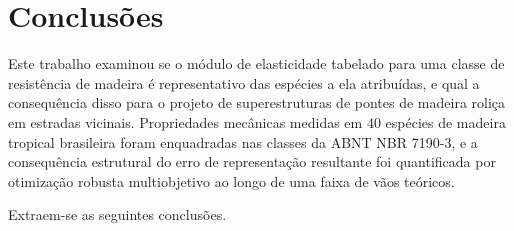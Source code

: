 \section{Conclusões}\label{sec:conclusions}

Este trabalho examinou se o módulo de elasticidade tabelado para uma classe de resistência de madeira é representativo das espécies a ela atribuídas, e qual a consequência disso para o projeto de superestruturas de pontes de madeira roliça em estradas vicinais. Propriedades mecânicas medidas em 40 espécies de madeira tropical brasileira foram enquadradas nas classes da ABNT NBR 7190-3, e a consequência estrutural do erro de representação resultante foi quantificada por otimização robusta multiobjetivo ao longo de uma faixa de vãos teóricos.

Extraem-se as seguintes conclusões.

